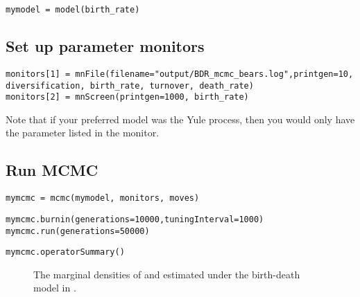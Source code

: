 {\tt \begin{snugshade*}
\begin{lstlisting}
mymodel = model(birth_rate)
\end{lstlisting}
\end{snugshade*}}


\subsection{Set up parameter monitors}


{\tt \begin{snugshade*}
\begin{lstlisting}
monitors[1] = mnFile(filename="output/BDR_mcmc_bears.log",printgen=10, diversification, birth_rate, turnover, death_rate)
monitors[2] = mnScreen(printgen=1000, birth_rate)
\end{lstlisting}
\end{snugshade*}}

Note that if your preferred model was the Yule process, then you would only have the  parameter listed in the  monitor.

\subsection{Run MCMC}

{\tt \begin{snugshade*}
\begin{lstlisting}
mymcmc = mcmc(mymodel, monitors, moves)
\end{lstlisting}
\end{snugshade*}}

{\tt \begin{snugshade*}
\begin{lstlisting}
mymcmc.burnin(generations=10000,tuningInterval=1000)
mymcmc.run(generations=50000)
\end{lstlisting}
\end{snugshade*}}

{\tt \begin{snugshade*}
\begin{lstlisting}
mymcmc.operatorSummary()
\end{lstlisting}
\end{snugshade*}}

\begin{figure}[h!]
\centering
{}
\caption{\small The marginal densities of  and  estimated under the birth-death model in \RevBayes.}
\label{tracerMarg}
\end{figure}

